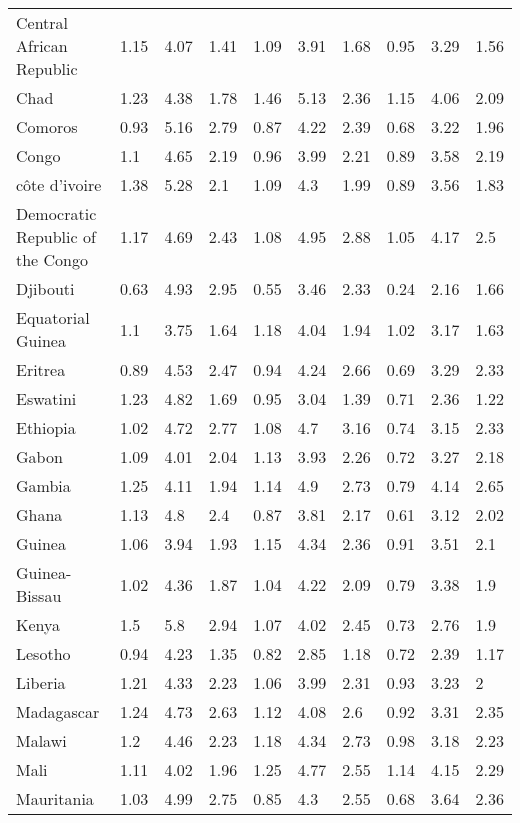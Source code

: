 \begin{longtable}[t]{llllllllll}
Central African Republic & 1.15 & 4.07 & 1.41 & 1.09 & 3.91 & 1.68 & 0.95 & 3.29 & 1.56\\
Chad & 1.23 & 4.38 & 1.78 & 1.46 & 5.13 & 2.36 & 1.15 & 4.06 & 2.09\\
Comoros & 0.93 & 5.16 & 2.79 & 0.87 & 4.22 & 2.39 & 0.68 & 3.22 & 1.96\\
Congo & 1.1 & 4.65 & 2.19 & 0.96 & 3.99 & 2.21 & 0.89 & 3.58 & 2.19\\
côte d'ivoire & 1.38 & 5.28 & 2.1 & 1.09 & 4.3 & 1.99 & 0.89 & 3.56 & 1.83\\
Democratic Republic of the Congo & 1.17 & 4.69 & 2.43 & 1.08 & 4.95 & 2.88 & 1.05 & 4.17 & 2.5\\
Djibouti & 0.63 & 4.93 & 2.95 & 0.55 & 3.46 & 2.33 & 0.24 & 2.16 & 1.66\\
Equatorial Guinea & 1.1 & 3.75 & 1.64 & 1.18 & 4.04 & 1.94 & 1.02 & 3.17 & 1.63\\
Eritrea & 0.89 & 4.53 & 2.47 & 0.94 & 4.24 & 2.66 & 0.69 & 3.29 & 2.33\\
Eswatini & 1.23 & 4.82 & 1.69 & 0.95 & 3.04 & 1.39 & 0.71 & 2.36 & 1.22\\
Ethiopia & 1.02 & 4.72 & 2.77 & 1.08 & 4.7 & 3.16 & 0.74 & 3.15 & 2.33\\
Gabon & 1.09 & 4.01 & 2.04 & 1.13 & 3.93 & 2.26 & 0.72 & 3.27 & 2.18\\
Gambia & 1.25 & 4.11 & 1.94 & 1.14 & 4.9 & 2.73 & 0.79 & 4.14 & 2.65\\
Ghana & 1.13 & 4.8 & 2.4 & 0.87 & 3.81 & 2.17 & 0.61 & 3.12 & 2.02\\
Guinea & 1.06 & 3.94 & 1.93 & 1.15 & 4.34 & 2.36 & 0.91 & 3.51 & 2.1\\
Guinea-Bissau & 1.02 & 4.36 & 1.87 & 1.04 & 4.22 & 2.09 & 0.79 & 3.38 & 1.9\\
Kenya & 1.5 & 5.8 & 2.94 & 1.07 & 4.02 & 2.45 & 0.73 & 2.76 & 1.9\\
Lesotho & 0.94 & 4.23 & 1.35 & 0.82 & 2.85 & 1.18 & 0.72 & 2.39 & 1.17\\
Liberia & 1.21 & 4.33 & 2.23 & 1.06 & 3.99 & 2.31 & 0.93 & 3.23 & 2\\
Madagascar & 1.24 & 4.73 & 2.63 & 1.12 & 4.08 & 2.6 & 0.92 & 3.31 & 2.35\\
Malawi & 1.2 & 4.46 & 2.23 & 1.18 & 4.34 & 2.73 & 0.98 & 3.18 & 2.23\\
Mali & 1.11 & 4.02 & 1.96 & 1.25 & 4.77 & 2.55 & 1.14 & 4.15 & 2.29\\
Mauritania & 1.03 & 4.99 & 2.75 & 0.85 & 4.3 & 2.55 & 0.68 & 3.64 & 2.36\\

\end{longtable}
